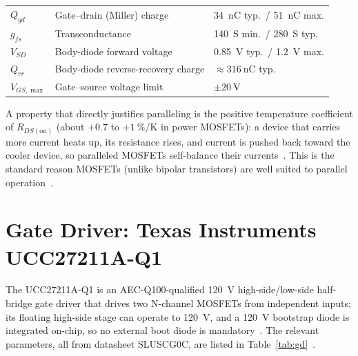 \documentclass[journal,onecolumn,11pt]{IEEEtran}
\newcommand{\Rdson}{R_{DS(\mathrm{on})}}
\begin{document}
\begin{table}[!t]
\begin{tabularx}{\textwidth}{@{}l L L@{}}
$Q_{gd}$ & Gate--drain (Miller) charge & \SI{34}{\nano\coulomb} typ.\ / \SI{51}{\nano\coulomb} max. \\
$g_{fs}$ & Transconductance & \SI{140}{\siemens} min.\ / \SI{280}{\siemens} typ. \\
$V_{SD}$ & Body-diode forward voltage & \SI{0.85}{\volt} typ.\ / \SI{1.2}{\volt} max. \\
$Q_{rr}$ & Body-diode reverse-recovery charge & $\approx\SI{316}{\nano\coulomb}$ typ. \\
$V_{GS,\max}$ & Gate--source voltage limit & $\pm\SI{20}{\volt}$ \\
\bottomrule
\end{tabularx}
\end{table}

A property that directly justifies paralleling is the positive temperature coefficient of $\Rdson$
(about $+0.7$ to $+\SI{1}{\percent\per\kelvin}$ in power MOSFETs): a device that carries more current
heats up, its resistance rises, and current is pushed back toward the cooler device, so paralleled
MOSFETs self-balance their currents~\cite{balogh}. This is the standard reason MOSFETs (unlike
bipolar transistors) are well suited to parallel operation~\cite{balogh}.

\section{Gate Driver: Texas Instruments UCC27211A-Q1}\label{sec:gd}

The UCC27211A-Q1 is an AEC-Q100-qualified \SI{120}{\volt} high-side/low-side half-bridge gate
driver that drives two N-channel MOSFETs from independent inputs; its floating high-side stage can
operate to \SI{120}{\volt}, and a \SI{120}{\volt} bootstrap diode is integrated on-chip, so no
external boot diode is mandatory~\cite{ucc27211,ucc27211folder}. The relevant parameters, all from
datasheet SLUSCG0C, are listed in Table~\ref{tab:gd}~\cite{ucc27211}.
\end{document}
